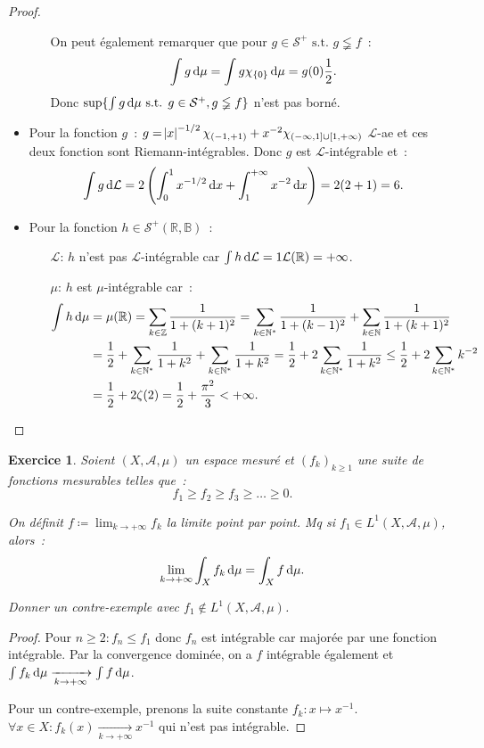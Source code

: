 \documentclass{article}
\newtheorem{ex}{Exercice}[section]
\theoremstyle{definition}
\newcommand{\pinfty}{{+\infty}}
\newcommand{\minfty}{{-\infty}}
\newcommand{\st}{\text{ s.t. }}
\newcommand{\N}{{\mathbb N}}
\newcommand{\Z}{{\mathbb Z}}
\newcommand{\R}{{\mathbb R}}
\newcommand{\B}{{\mathbb B}}
\begin{document}
\begin{proof}
\begin{itemize}
\begin{itemize}
		On peut également remarquer que pour $g \in \mathcal S^+ \st g \lneqq f$~:
		\[\int g\dif\mu = \int g\chi_{\{0\}}\dif\mu = g(0)\frac 12.\]
		Donc $\sup\{\int g\dif\mu \st g \in \mathcal S^+, g \lneqq f\}$ n'est pas borné.
	\end{itemize}
	\item Pour la fonction $g$~: $g = \abs x^{-1/2}\chi_{(-1, +1)} + x^{-2}\chi_{(\minfty, 1] \cup [1, \pinfty)}$ $\mathcal L$-ae et ces deux fonction sont Riemann-intégrables. Donc
	$g$ est $\mathcal L$-intégrable et~:
	\[\int g\dif \mathcal L = 2\left(\int_0^1x^{-1/2}\dif x + \int_1^\pinfty x^{-2}\dif x\right) = 2(2+1) = 6.\]
	\item Pour la fonction $h \in \mathcal S^+(\R, \B)$~:
	\begin{itemize}
		\item[$\mathcal L$:] $h$ n'est pas $\mathcal L$-intégrable car $\int h\dif\mathcal L = 1\mathcal L(\R) = \pinfty$.
		\item[$\mu$:]        $h$ est $\mu$-intégrable car~:
		\begin{align*}
			\int h\dif\mu &= \mu(\R) = \sum_{k \in \Z}\frac 1{1+(k+1)^2} = \sum_{k \in \N^*}\frac 1{1+(k-1)^2} + \sum_{k \in \N}\frac 1{1+(k+1)^2} \\
				&= \frac 12 + \sum_{k \in \N^*}\frac 1{1+k^2} + \sum_{k \in \N^*}\frac 1{1+k^2} = \frac 12 + 2\sum_{k \in \N^*}\frac 1{1+k^2} \leq \frac 12 + 2\sum_{k \in \N^*}k^{-2} \\
				&= \frac 12 + 2\zeta(2) = \frac 12 + \frac {\pi^2}3 < \pinfty.
		\end{align*}
	\end{itemize}
\end{itemize}
\end{proof}

\begin{ex} Soient $(X, \mathcal A, \mu)$ un espace mesuré et $(f_k)_{k \geq 1}$ une suite de fonctions mesurables telles que~:
\[f_1 \geq f_2 \geq f_3 \geq \ldots \geq 0.\]

On définit $f \coloneqq  \lim_{k \to \pinfty}f_k$ la limite point par point. Mq si $f_1 \in L^1(X, \mathcal A, \mu)$, alors~:
\[\lim_{k \to \pinfty}\int_Xf_k\dif\mu = \int_Xf\dif\mu.\]

Donner un contre-exemple avec $f_1 \not \in L^1(X, \mathcal A, \mu)$.
\end{ex}

\begin{proof} Pour $n \geq 2 : f_n \leq f_1$ donc $f_n$ est intégrable car majorée par une fonction intégrable. Par la convergence dominée, on a $f$ intégrable
également et $\int f_k\dif\mu \xrightarrow[k \to \pinfty]{} \int f\dif\mu$.

Pour un contre-exemple, prenons la suite constante $f_k : x \mapsto x^{-1}$. $\forall x \in X : f_k(x) \xrightarrow[k \to \pinfty]{} x^{-1}$ qui n'est pas intégrable.
\end{proof}
\end{document}
